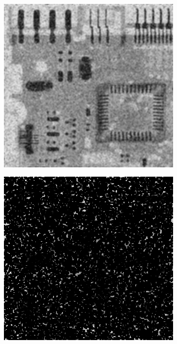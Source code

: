 \begin{figure}[h]
\begin{subfigure}[b]{0.4\linewidth}
		\caption{}
		\label{fig:5-12b}
	\end{subfigure}
  	\begin{subfigure}[b]{0.4\linewidth}
		\includegraphics[width=\linewidth]{myfigure/p4/42-unipepsalt-arimean.png}
		\caption{}
		\label{fig:5-12c}
	\end{subfigure}
  	\begin{subfigure}[b]{0.4\linewidth}
		\includegraphics[width=\linewidth]{myfigure/p4/42-unipepsalt-geomean.png}

\end{subfigure}
\end{figure}
